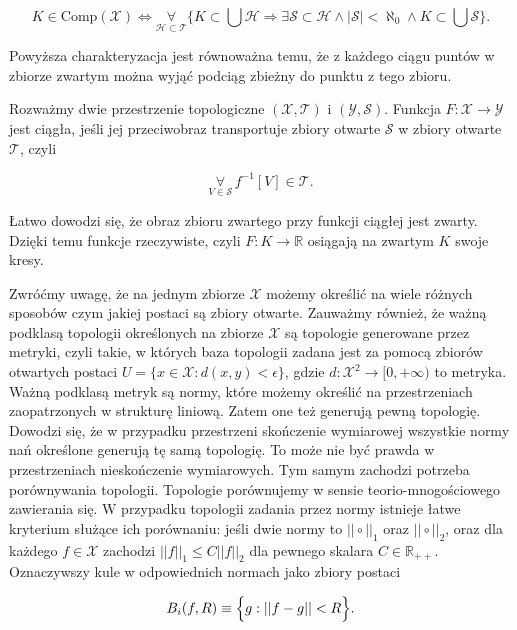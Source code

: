 \begin{equation*}
	K \in \mathrm{Comp}(\mathcal{X}) \Longleftrightarrow \underset{\mathcal{H} \subset \mathcal{T} }{\forall} \Big \{  K \subset \bigcup{\mathcal{H}}  \Longrightarrow \exists \mathcal{S} \subset \mathcal{H} \wedge |\mathcal{S}| < \aleph_0 \wedge K \subset \bigcup \mathcal{S}\Big \}.
\end{equation*}

Powyższa charakteryzacja jest równoważna temu, że z każdego ciągu puntów w zbiorze zwartym można wyjąć podciąg zbieżny do punktu z tego zbioru.

Rozważmy dwie przestrzenie topologiczne $ (\mathcal{X}, \mathcal{T}) $ i $ (\mathcal{Y}, \mathcal{S}) $. Funkcja $ F : \mathcal{X} \rightarrow \mathcal{Y} $ jest ciągła, jeśli jej przeciwobraz transportuje zbiory otwarte $ \mathcal{S} $ w zbiory otwarte $ \mathcal{T} $, czyli

$$ \underset{V \in \mathcal{S}}{\forall} \, f^{-1}[V] \in \mathcal{T}. $$

Łatwo dowodzi się, że obraz zbioru zwartego przy funkcji ciągłej jest zwarty. Dzięki temu funkcje rzeczywiste, czyli $F: K \rightarrow \mathbb{R} $ osiągają na zwartym $K$ swoje kresy. 

Zwróćmy uwagę, że na jednym zbiorze $ \mathcal{X} $ możemy określić na wiele różnych sposobów czym jakiej postaci są zbiory otwarte. Zauważmy również, że ważną podklasą topologii określonych na zbiorze $ \mathcal{X} $ są topologie generowane przez metryki, czyli takie, w których baza topologii zadana jest za pomocą zbiorów otwartych postaci $ U = \{x \in \mathcal{X}: d(x,y) < \epsilon \}$, gdzie $ d: \mathcal{X}^{2} \rightarrow [0, +\infty) $ to metryka. Ważną podklasą metryk są normy, które możemy określić na przestrzeniach zaopatrzonych w strukturę liniową. Zatem one też generują pewną topologię. Dowodzi się, że w przypadku przestrzeni skończenie wymiarowej wszystkie normy nań określone generują tę samą topologię. To może nie być prawda w przestrzeniach nieskończenie wymiarowych. Tym samym zachodzi potrzeba porównywania topologii. Topologie porównujemy w sensie teorio-mnogościowego zawierania się. W przypadku topologii zadania przez normy istnieje łatwe kryterium służące ich porównaniu: jeśli dwie normy to $ ||\circ||_1 $ oraz $ ||\circ||_2 $, oraz dla każdego $ f \in \mathcal{X} $ zachodzi $ ||f||_1  \leq C||f||_2 $ dla pewnego skalara $ C \in \mathbb{R}_{++}$. Oznaczywszy kule w odpowiednich normach jako zbiory postaci

$$ B_i (f, R) \equiv \Bigl\{	g : ||f-g||< R	 \Bigl\}.$$

